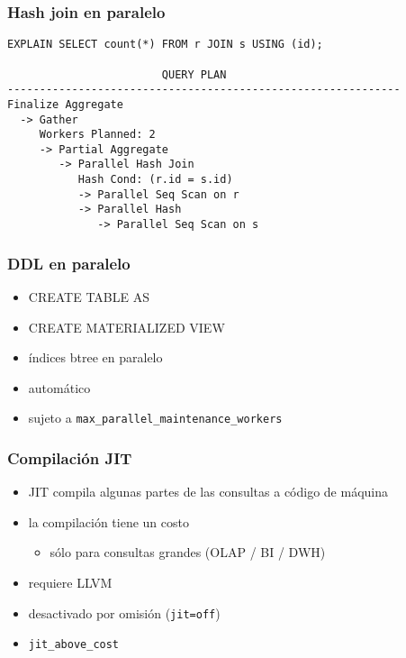 \begin{frame}[fragile]
  \frametitle{Hash join en paralelo}

\footnotesize
\begin{lstlisting}
EXPLAIN SELECT count(*) FROM r JOIN s USING (id);

                        QUERY PLAN
-------------------------------------------------------------
Finalize Aggregate
  -> Gather
     Workers Planned: 2
     -> Partial Aggregate
        -> Parallel Hash Join
           Hash Cond: (r.id = s.id)
           -> Parallel Seq Scan on r
           -> Parallel Hash
              -> Parallel Seq Scan on s
\end{lstlisting}
\end{frame}

\begin{frame}
  \frametitle{DDL en paralelo}

  \begin{itemize}
    \item CREATE TABLE AS
    \item CREATE MATERIALIZED VIEW
    \item{índices btree en paralelo}
    \end{itemize}

  \begin{itemize}
    \item automático
    \item sujeto a \texttt{max\_parallel\_maintenance\_workers}
  \end{itemize}

\end{frame}

\begin{frame}
  \frametitle{Compilación JIT}

  \begin{itemize}
    \item JIT compila algunas partes de las consultas a código de máquina
    \item la compilación tiene un costo
       \begin{itemize}
	  \item sólo para consultas grandes (OLAP / BI / DWH)
       \end{itemize}
    \item requiere LLVM
    \item desactivado por omisión (\texttt{jit=off})
    \item \texttt{jit\_above\_cost}
  \end{itemize}
\end{frame}

